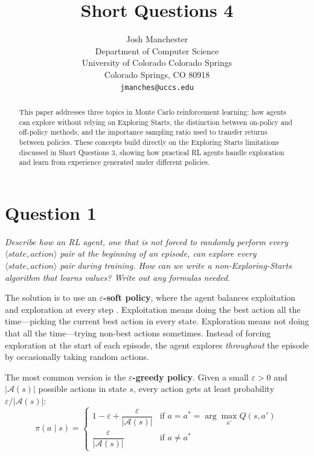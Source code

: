 \documentclass[letterpaper]{article}
\title{Short Questions 4}
\author{
    Josh Manchester\\
    Department of Computer Science\\
    University of Colorado Colorado Springs\\
    Colorado Springs, CO 80918\\
    \texttt{jmanches@uccs.edu}
}
\begin{document}
\maketitle

\begin{abstract}
This paper addresses three topics in Monte Carlo reinforcement learning: how agents can explore without relying on Exploring Starts, the distinction between on-policy and off-policy methods, and the importance sampling ratio used to transfer returns between policies. These concepts build directly on the Exploring Starts limitations discussed in Short Questions 3, showing how practical RL agents handle exploration and learn from experience generated under different policies.
\end{abstract}

\section*{Question 1}
\textit{Describe how an RL agent, one that is not forced to randomly perform every $\langle state, action \rangle$ pair at the beginning of an episode, can explore every $\langle state, action \rangle$ pair during training. How can we write a non-Exploring-Starts algorithm that learns values? Write out any formulas needed.}

\vspace{0.5em}

The solution is to use an \textbf{$\varepsilon$-soft policy}, where the agent balances exploitation and exploration at every step \citep{sutton2018reinforcement}. Exploitation means doing the best action all the time---picking the current best action in every state. Exploration means not doing that all the time---trying non-best actions sometimes. Instead of forcing exploration at the start of each episode, the agent explores \textit{throughout} the episode by occasionally taking random actions.

The most common version is the \textbf{$\varepsilon$-greedy policy}. Given a small $\varepsilon > 0$ and $|\mathcal{A}(s)|$ possible actions in state $s$, every action gets at least probability $\varepsilon / |\mathcal{A}(s)|$:
\[
\pi(a \mid s) =
\begin{cases}
1 - \varepsilon + \dfrac{\varepsilon}{|\mathcal{A}(s)|} & \text{if } a = a^* = \arg\max_{a'} Q(s, a') \\[6pt]
\dfrac{\varepsilon}{|\mathcal{A}(s)|} & \text{if } a \neq a^*
\end{cases}
\]
\end{document}
